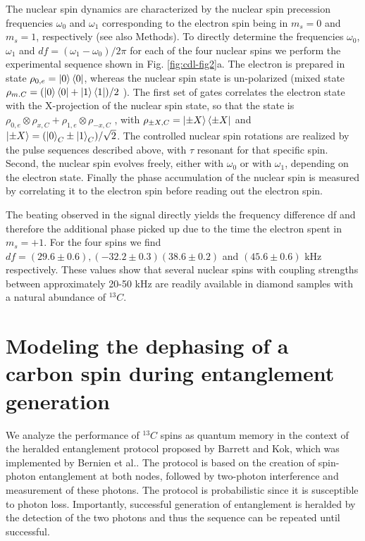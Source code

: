The nuclear spin dynamics are characterized by the nuclear spin precession frequencies $\omega_0$ and $\omega_1$  corresponding to the electron spin being in $m_s = 0$ and $m_s = 1$, respectively (see also Methods). To directly determine the frequencies $\omega_0$,  $\omega_1$ and $df = ( \omega_1 − \omega_0 )/2 \pi$  for each of the four nuclear spins we perform the experimental sequence\cite{Laraoui_NatCommun_2013} shown in Fig. \ref{fig:cdl-fig2}a. The electron is prepared in state $\rho_{0,e} = \left|0\right>\left<0\right|$, whereas the nuclear spin state is un-polarized (mixed state $\rho_{m.C} = (\left|0\right>\left<0\right| + \left|1\right>\left<1\right|)/2$ ). The first set of gates correlates the electron state with the X-projection of the nuclear spin state, so that the state is $\rho_{0,e} \otimes \rho_{x,C} + \rho_{1,e} \otimes \rho_{-x,C}$ , with $\rho_{\pm X,C} = \left|\pm X\right>\left<\pm X\right|$ and  $\left|\pm X\right> = (\left|0\right>_C \pm \left|1\right>_C)/\sqrt{2}$. The controlled nuclear spin rotations are realized by the pulse sequences described above, with $\tau$ resonant for that specific spin. Second, the nuclear spin evolves freely, either with $\omega_0$ or with $\omega_1$, depending on the electron state. Finally the phase accumulation of the nuclear spin is measured by correlating it to the electron spin before reading out the electron spin. 

The beating observed in the signal directly yields the frequency difference df and therefore the additional phase picked up due to the time the electron spent in $m_s = + 1$.   For the four spins we find $df = (29.6 \pm 0.6), (-32.2 \pm 0.3) (38.6 \pm 0.2)$ and $ (45.6 \pm 0.6) $  kHz respectively.  These values show that several nuclear spins with coupling strengths between approximately 20-50 kHz are readily available in diamond samples with a natural abundance of $^{13}C$.

\section{Modeling the dephasing of a carbon spin during entanglement generation}

We analyze the performance of $^{13}C$ spins as quantum memory in the context of  the  heralded entanglement protocol proposed by Barrett and Kok\cite{Barrett_Phys.Rev.A_2005}, which was implemented by Bernien et al.\cite{Bernien_Nature_2013}. The protocol is based on the creation of spin-photon entanglement at both nodes, followed by two-photon interference and measurement of these photons. The protocol is probabilistic since it is susceptible to photon loss. Importantly, successful generation of entanglement is heralded by the detection of the two photons and thus the sequence can be repeated until successful. 

